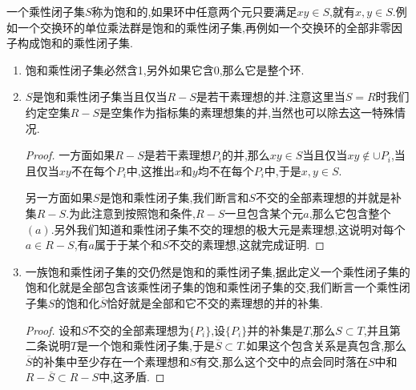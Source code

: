 一个乘性闭子集$S$称为饱和的,如果环中任意两个元只要满足$xy\in S$,就有$x,y\in S$.例如一个交换环的单位乘法群是饱和的乘性闭子集,再例如一个交换环的全部非零因子构成饱和的乘性闭子集.
\begin{enumerate}
	\item 饱和乘性闭子集必然含1,另外如果它含0,那么它是整个环.
	\item $S$是饱和乘性闭子集当且仅当$R-S$是若干素理想的并.注意这里当$S=R$时我们约定空集$R-S$是空集作为指标集的素理想集的并,当然也可以除去这一特殊情况.
	\begin{proof}
		
		一方面如果$R-S$是若干素理想$P_i$的并,那么$xy\in S$当且仅当$xy\not\in\cup P_i$,当且仅当$xy$不在每个$P_i$中,这推出$x$和$y$均不在每个$P_i$中,于是$x,y\in S$.
		
		另一方面如果$S$是饱和乘性闭子集,我们断言和$S$不交的全部素理想的并就是补集$R-S$.为此注意到按照饱和条件,$R-S$一旦包含某个元$a$,那么它包含整个$(a)$.另外我们知道和乘性闭子集不交的理想的极大元是素理想,这说明对每个$a\in R-S$,有$a$属于于某个和$S$不交的素理想,这就完成证明.
	\end{proof}
    \item 一族饱和乘性闭子集的交仍然是饱和的乘性闭子集,据此定义一个乘性闭子集的饱和化就是全部包含该乘性闭子集的饱和乘性闭子集的交,我们断言一个乘性闭子集$S$的饱和化$\overline{S}$恰好就是全部和它不交的素理想的并的补集.
    \begin{proof}
    	
    	设和$S$不交的全部素理想为$\{P_i\}$,设$\{P_i\}$并的补集是$T$,那么$S\subset T$,并且第二条说明$T$是一个饱和乘性闭子集,于是$\overline{S}\subset T$.如果这个包含关系是真包含,那么$\overline{S}$的补集中至少存在一个素理想和$S$有交,那么这个交中的点会同时落在$S$中和$R-\overline{S}\subset R-S$中,这矛盾.
    \end{proof}
\end{enumerate}

